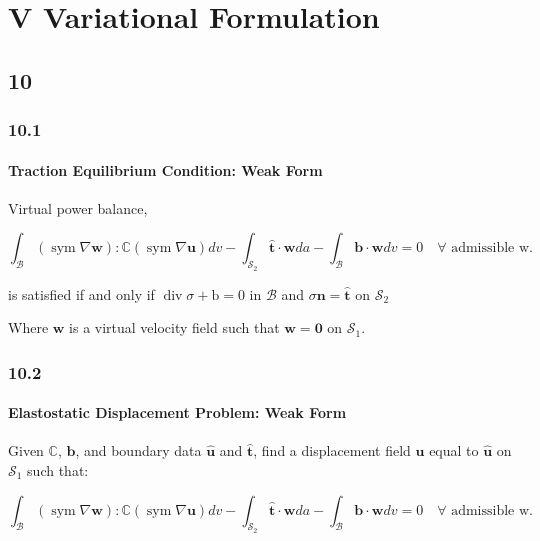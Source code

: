 \hypertarget{v-variational-formulation}{%
\section{V Variational Formulation}\label{v-variational-formulation}}

\hypertarget{section}{%
\subsection{10}\label{section}}

\hypertarget{section-1}{%
\subsubsection{10.1}\label{section-1}}

\hypertarget{traction-equilibrium-condition-weak-form}{%
\paragraph{Traction Equilibrium Condition: Weak
Form}\label{traction-equilibrium-condition-weak-form}}

Virtual power balance,

\[\int_{\mathcal{B}}(\operatorname{sym} \nabla \mathbf{w}): \mathbb{C}(\operatorname{sym} \nabla \mathbf{u}) d v-\int_{\mathcal{S}_{2}} \hat{\mathbf{t}} \cdot \mathbf{w} d a-\int_{\mathcal{B}} \mathbf{b} \cdot \mathbf{w} d v=0 \quad \forall \text{ admissible w.}\]

is satisfied if and only if
\(\operatorname{div} \sigma+\mathrm{b}=0 \text{ in } \mathcal{B}\) and
\(\sigma \mathbf{n}=\hat{\mathbf{t}}\) on \(\mathcal{S}_{2}\)

Where \(\mathbf{w}\) is a virtual velocity field such that
\(\mathbf{w}=\mathbf{0}\) on \(\mathcal{S}_{1}\).

\hypertarget{section-2}{%
\subsubsection{10.2}\label{section-2}}

\hypertarget{elastostatic-displacement-problem-weak-form}{%
\paragraph{Elastostatic Displacement Problem: Weak
Form}\label{elastostatic-displacement-problem-weak-form}}

Given \(\mathbb{C}\), \(\mathbf{b}\), and boundary data
\(\mathbf{\hat{u}}\) and \(\mathbf{\hat{t}}\), find a displacement field
\(\mathbf{u}\) equal to \(\mathbf{\hat{u}}\) on \(\mathcal{S}_{1}\) such
that:

\[\int_{\mathcal{B}}(\operatorname{sym} \nabla \mathbf{w}): \mathbb{C}(\operatorname{sym} \nabla \mathbf{u}) d v-\int_{\mathcal{S}_{2}} \hat{\mathbf{t}} \cdot \mathbf{w} d a-\int_{\mathcal{B}} \mathbf{b} \cdot \mathbf{w} d v=0 \quad \forall \text{ admissible w.}\]
